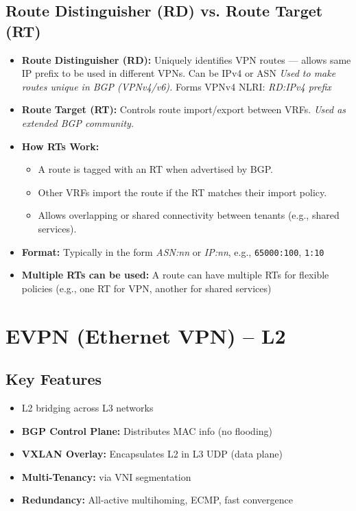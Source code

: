 \begin{multicols*}{5}
		\subsection{Route Distinguisher (RD) vs. Route Target (RT)}
		\begin{itemize}
			\item \textbf{Route Distinguisher (RD):}
			Uniquely identifies VPN routes — allows same IP prefix to be used in different VPNs. Can be IPv4 or ASN 
			\textit{Used to make routes unique in BGP (VPNv4/v6).} Forms VPNv4 NLRI: \textit{RD:IPv4 prefix} 
			
			\item \textbf{Route Target (RT):}
			Controls route import/export between VRFs.
			\textit{Used as extended BGP community.}
			
			\item \textbf{How RTs Work:}
			\begin{itemize}
				\item A route is tagged with an RT when advertised by BGP.
				\item Other VRFs import the route if the RT matches their import policy.
				\item Allows overlapping or shared connectivity between tenants (e.g., shared services).
			\end{itemize}
			
			\item \textbf{Format:}
			Typically in the form \textit{ASN:nn} or \textit{IP:nn}, e.g., \texttt{65000:100}, \texttt{1:10}
			
			\item \textbf{Multiple RTs can be used:}
			A route can have multiple RTs for flexible policies (e.g., one RT for VPN, another for shared services)
		\end{itemize}
		
		\section{EVPN (Ethernet VPN) – L2}
		
		\subsection{Key Features}
		\begin{itemize}
			\item L2 bridging across L3 networks
			\item \textbf{BGP Control Plane:} Distributes MAC info (no flooding)
			\item \textbf{VXLAN Overlay:} Encapsulates L2 in L3 UDP (data plane)
			\item \textbf{Multi-Tenancy:} via VNI segmentation
			\item \textbf{Redundancy:} All-active multihoming, ECMP, fast convergence
		\end{itemize}
		

\end{multicols*}
